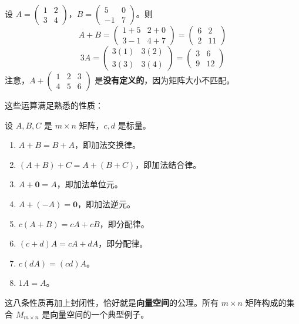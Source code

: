 \begin{example}
设 $A=\begin{pmatrix}1&2\\3&4\end{pmatrix}$，$B=\begin{pmatrix}5&0\\-1&7\end{pmatrix}$。则
\[ A+B = \begin{pmatrix} 1+5 & 2+0 \\ 3-1 & 4+7 \end{pmatrix} = \begin{pmatrix} 6 & 2 \\ 2 & 11 \end{pmatrix} \]
\[ 3A = \begin{pmatrix} 3(1) & 3(2) \\ 3(3) & 3(4) \end{pmatrix} = \begin{pmatrix} 3 & 6 \\ 9 & 12 \end{pmatrix} \]
注意，$A + \begin{pmatrix}1&2&3\\4&5&6\end{pmatrix}$ 是\textbf{没有定义的}，因为矩阵大小不匹配。
\end{example}

这些运算满足熟悉的性质：
\begin{property}[加法与数乘的性质]
设 $A,B,C$ 是 $m\times n$ 矩阵，$c,d$ 是标量。
\begin{enumerate}
    \item $A+B=B+A$，即加法交换律。
    \item $(A+B)+C=A+(B+C)$，即加法结合律。
    \item $A+\mathbf{0}=A$，即加法单位元。
    \item $A+(-A)=\mathbf{0}$，即加法逆元。
    \item $c(A+B)=cA+cB$，即分配律。
    \item $(c+d)A=cA+dA$，即分配律。
    \item $c(dA)=(cd)A$。
    \item $1A=A$。
\end{enumerate}
\end{property}
\begin{remark}
这八条性质再加上封闭性，恰好就是\textbf{向量空间}的公理。所有 $m\times n$ 矩阵构成的集合 $M_{m\times n}$ 是向量空间的一个典型例子。
\end{remark}

